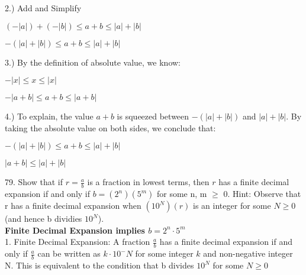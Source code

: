 \documentclass{article}
\begin{document}
2.) Add and Simplify\\
\begin{center}$(-\left|a\right|)+(-\left| b\right|) \leq a + b \leq \left|a\right| + \left|b\right|$\\\end{center}
\begin{center}$-(\left|a\right| + \left|b\right|) \leq a + b \leq \left|a\right| + \left|b\right|$\\\end{center}

3.) By the definition of absolute value, we know:\\
\begin{center}$-\left|x\right| \leq x \leq \left|x\right|$\\\end{center}
\begin{center}$-\left|a+b\right| \leq a+b \leq \left|a+b\right|$\\\end{center}

4.) To explain, the value $a + b$ is squeezed between $-(\left|a\right| + \left|b\right|)$ and $\left|a\right| + \left|b\right|$. By taking the absolute value on both sides, we conclude that: \\
\begin{center}$-(\left|a\right| + \left|b\right|) \leq a + b \leq \left|a\right| + \left|b\right|$\\\end{center}
\begin{center}$\left|a + b\right| \leq \left|a\right| + \left|b\right|$\\\end{center}

\newpage

79. Show that if $r=\frac{a}{b}$ is a fraction in lowest terms, then $r$ has a finite decimal expansion if and only if $b = (2^n)(5^m)$ for some n, m $\geq$ 0. Hint: Observe that r has a finite decimal expansion when $(10^N)(r)$ is an integer for some $N\geq0$ (and hence b dividies $10^N$).\\

\textbf{Finite Decimal Expansion implies $b = 2^n \cdot 5^m$}\\

1. Finite Decimal Expansion: A fraction $\frac{a}{b}$ has a finite decimal expansion if and only if $\frac{a}{b}$ can be written as $k \cdot 10^-N$ for some integer $k$ and non-negative integer N. This is equivalent to the condition that b divides $10^N$ for some $N \geq 0$\\
\end{document}
